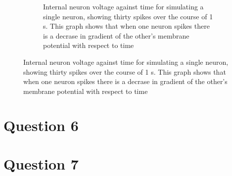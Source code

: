 \documentclass[12pt, a4paper]{article}
\begin{document}
\begin{figure}[H]
\begin{subfigure}[t]{0.5\textwidth}
    \caption{Internal neuron voltage against time for simulating a single neuron, showing thirty spikes over the course of 1 s. This graph shows that when one neuron spikes there is a decrase in gradient of the other's membrane potential with respect to time}
  \end{subfigure}
\end{figure}

\section*{Question 6}

\section*{Question 7}


\bibdata
\end{document}
